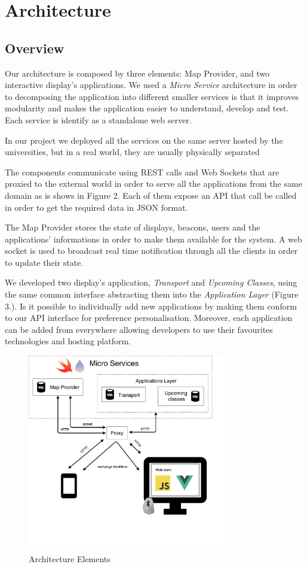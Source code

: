 \documentclass[]{usiinfbachelorproject}
\begin{document}
\section{Architecture}
\subsection{Overview}
Our architecture is composed by three elements: Map Provider, and two interactive display's applications. We used a \emph{Micro Service} architecture in order to decomposing the application into different smaller services is that it improves modularity and makes the application easier to understand, develop and test. Each service is identify as a standalone web server.

In our project we deployed all the services on the same server hosted by the universities, but in a real world, they are usually physically separated

The components communicate using REST calls and Web Sockets that are proxied to the external world in order to serve all the applications from the same domain as is shows in Figure 2. Each of them expose an API that call be called in order to get the required data in JSON format.

The Map Provider stores the state of displays, beacons, users and the applications' informations in order to make them available for the system. A web socket is used to broadcast real time notification through all the clients in order to update their state.

We developed two display's application, \emph{Transport} and \emph{Upcoming Classes}, using the same common interface abstracting them into the \emph{Application Layer} (Figure 3.). Is it possible to individually add new applications by making them conform to our API interface for preference personalisation. Moreover, each application can be added from everywhere allowing developers to use their favourites technologies and hosting platform.
\begin{figure}[H]
  \centering
  \includegraphics[width=0.8\textwidth]{./images/poster_image_1.png}
    \caption{Architecture Elements}
\end{figure} 
\end{document}
